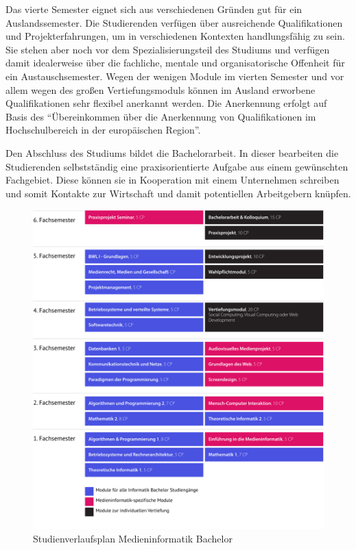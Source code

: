 Das vierte Semester eignet sich aus verschiedenen Gründen gut für ein
Auslandssemester. Die Studierenden verfügen über ausreichende
Qualifikationen und Projekterfahrungen, um in verschiedenen Kontexten
handlungsfähig zu sein. Sie stehen aber noch vor dem
Spezialisierungsteil des Studiums und verfügen damit idealerweise über
die fachliche, mentale und organisatorische Offenheit für ein
Austauschsemester. Wegen der wenigen Module im vierten Semester und vor
allem wegen des großen Vertiefungsmoduls können im Ausland erworbene
Qualifikationen sehr flexibel anerkannt werden. Die Anerkennung erfolgt
auf Basis des ``Übereinkommen über die Anerkennung von Qualifikationen
im Hochschulbereich in der europäischen Region''.

Den Abschluss des Studiums bildet die Bachelorarbeit. In dieser
bearbeiten die Studierenden selbstständig eine praxisorientierte Aufgabe
aus einem gewünschten Fachgebiet. Diese können sie in Kooperation mit
einem Unternehmen schreiben und somit Kontakte zur Wirtschaft und damit
potentiellen Arbeitgebern knüpfen.

\begin{figure}
\centering
\includegraphics[width=\columnwidth]{../anhaenge/bilder/studienverlaufsplan-mi-bachelor.png}
\caption{Studienverlaufsplan Medieninformatik Bachelor}
\end{figure}

